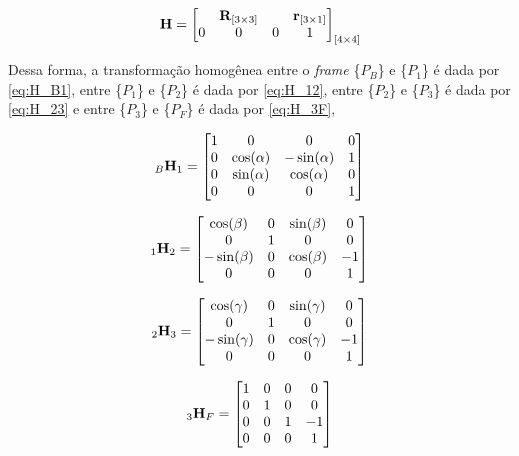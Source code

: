 \begin{equation}
	\mathbf{H} = \begin{bmatrix}
		&	\mathbf{R}_{[3\times 3]} & & \mathbf{r}_{[3\times 1]} \\
		0 & 0 & 0 & 1
	\end{bmatrix}_{[4\times 4]}
	\label{eq:H}
\end{equation}

Dessa forma, a transformação homogênea entre o \textit{frame}  \{$P_B$\} e  \{$P_1$\} é dada por \eqref{eq:H_B1}, entre \{$P_1$\} e  \{$P_2$\} é dada por \eqref{eq:H_12},  entre \{$P_2$\} e  \{$P_3$\} é dada por \eqref{eq:H_23} e  entre \{$P_3$\} e  \{$P_F$\} é dada por \eqref{eq:H_3F}, 

\begin{equation}\label{eq:H_B1}
	_B \mathbf{H}_{1} = \begin{bmatrix}
		1 & 0            & 0              & 0\\
		0 & \cos(\alpha) & -\sin(\alpha)  & 1\\
		0 & \sin(\alpha) & \cos(\alpha)   & 0 \\
		0 & 0 & 0                         & 1
	\end{bmatrix}
\end{equation}


\begin{equation}\label{eq:H_12}
	_1 \mathbf{H}_{2} = \begin{bmatrix}
		\cos(\beta)  & 0  & \sin(\beta)  &  0 \\
		0          & 1  & 0                  &  0 \\
		-\sin(\beta) & 0  & \cos(\beta)      & -1  \\
		0 & 0 & 0 & 1
	\end{bmatrix}
\end{equation}


\begin{equation}\label{eq:H_23}
	_2 \mathbf{H}_{3} = \begin{bmatrix}
		\cos(\gamma)  & 0  & \sin(\gamma)  &  0 \\
		0          & 1  & 0                  &  0 \\
		-\sin(\gamma) & 0  & \cos(\gamma)      & -1  \\
		0 & 0 & 0 & 1
	\end{bmatrix}
\end{equation}


\begin{equation}\label{eq:H_3F}
	_3 \mathbf{H}_{F} = \begin{bmatrix}
		1 & 0  & 0      &  0 \\
		0 & 1  & 0      &  0 \\
		0 & 0  & 1      & -1  \\
		0 & 0  & 0      & 1
	\end{bmatrix}
\end{equation}

